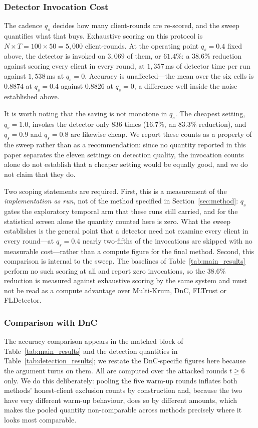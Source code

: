 \documentclass[journal]{IEEEtran}
\begin{document}
\subsubsection{Detector Invocation Cost}
\label{sec:invocation_cost}
The cadence $q_s$ decides how many client-rounds are re-scored, and the sweep quantifies what
that buys. Exhaustive scoring on this protocol is $N \times T = 100 \times 50 = 5{,}000$
client-rounds. At the operating point $q_s = 0.4$ fixed above, the detector is invoked on
$3{,}069$ of them, or $61.4\%$: a $38.6\%$ reduction against scoring every client in every
round, at $1{,}357$\,ms of detector time per run against $1{,}538$\,ms at $q_s = 0$. Accuracy
is unaffected---the mean over the six cells is $0.8874$ at $q_s = 0.4$ against $0.8826$ at
$q_s = 0$, a difference well inside the noise established above.

It is worth noting that the saving is not monotone in $q_s$. The cheapest setting,
$q_s = 1.0$, invokes the detector only $836$ times ($16.7\%$, an $83.3\%$ reduction), and
$q_s = 0.9$ and $q_s = 0.8$ are likewise cheap. We report these counts as a property of the
sweep rather than as a recommendation: since no quantity reported in this paper separates the
eleven settings on detection quality, the invocation counts alone do not establish that a
cheaper setting would be equally good, and we do not claim that they do.

Two scoping statements are required. First, this is a measurement of the \emph{implementation
as run}, not of the method specified in Section~\ref{sec:method}: $q_s$ gates the exploratory
temporal arm that these runs still carried, and for the statistical screen alone the quantity
counted here is zero. What the sweep establishes is the general point that a detector need
not examine every client in every round---at $q_s = 0.4$ nearly two-fifths of the invocations
are skipped with no measurable cost---rather than a compute figure for the final method.
Second, this comparison is internal to the sweep. The baselines of
Table~\ref{tab:main_results} perform no such scoring at all and report zero invocations, so
the $38.6\%$ reduction is measured against exhaustive scoring by the same system and must not
be read as a compute advantage over Multi-Krum, DnC, FLTrust or FLDetector.

\subsubsection{Comparison with DnC}
The accuracy comparison appears in the matched block of Table~\ref{tab:main_results} and the detection quantities in Table~\ref{tab:detection_results}; we restate the DnC-specific figures here because the argument turns on them. All are computed over the attacked rounds $t \ge 6$ only. We do this deliberately: pooling the five warm-up rounds inflates both methods' honest-client exclusion counts by construction and, because the two have very different warm-up behaviour, does so by different amounts, which makes the pooled quantity non-comparable across methods precisely where it looks most comparable.
\end{document}
